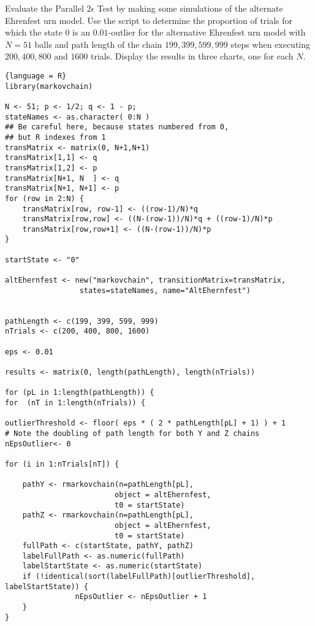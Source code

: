 \documentclass[12pt]{article}
\begin{document}
\begin{exercise}
   Evaluate the Parallel \(2 \epsilon\) Test by making some
   simulations of the alternate Ehrenfest urn model.
   Use the script to determine the proportion of trials for which the
    state \( 0 \) is an \( 0.01 \)-outlier for the alternative Ehrenfest
    urn model with \( N = 51 \) balls and path length of the
    chain \( 199, 399, 599, 999 \) steps when executing \( 200, 400, 800
    \) and \( 1600 \) trials.  Display the results in three charts, one
    for each \( N \).
\end{exercise}
\begin{solution}

  \begin{lstlisting}{language = R}
library(markovchain)

N <- 51; p <- 1/2; q <- 1 - p;
stateNames <- as.character( 0:N )
## Be careful here, because states numbered from 0,
## but R indexes from 1
transMatrix <- matrix(0, N+1,N+1)
transMatrix[1,1] <- q
transMatrix[1,2] <- p
transMatrix[N+1, N  ] <- q
transMatrix[N+1, N+1] <- p
for (row in 2:N) {
    transMatrix[row, row-1] <- ((row-1)/N)*q
    transMatrix[row,row] <- ((N-(row-1))/N)*q + ((row-1)/N)*p
    transMatrix[row,row+1] <- ((N-(row-1))/N)*p
}

startState <- "0"

altEhernfest <- new("markovchain", transitionMatrix=transMatrix,
                 states=stateNames, name="AltEhernfest")


pathLength <- c(199, 399, 599, 999)
nTrials <- c(200, 400, 800, 1600)

eps <- 0.01

results <- matrix(0, length(pathLength), length(nTrials))

for (pL in 1:length(pathLength)) {
for  (nT in 1:length(nTrials)) {

outlierThreshold <- floor( eps * ( 2 * pathLength[pL] + 1) ) + 1
# Note the doubling of path length for both Y and Z chains
nEpsOutlier<- 0

for (i in 1:nTrials[nT]) {
            
    pathY <- rmarkovchain(n=pathLength[pL],
                         object = altEhernfest,
                         t0 = startState)
    pathZ <- rmarkovchain(n=pathLength[pL],
                         object = altEhernfest,
                         t0 = startState)
    fullPath <- c(startState, pathY, pathZ)
    labelFullPath <- as.numeric(fullPath)
    labelStartState <- as.numeric(startState)
    if (!identical(sort(labelFullPath)[outlierThreshold], labelStartState)) {
                nEpsOutlier <- nEpsOutlier + 1
    }
}


\end{lstlisting}
\end{solution}
\end{document}
